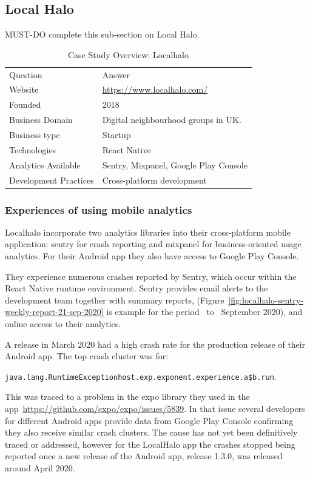\subsection{Local Halo}
MUST-DO complete this sub-section on Local Halo.

\begin{table}[htbp!]
    \centering
    \small
    \begin{tabular}{ll}
       Question &Answer  \\
       Website &\url{https://www.localhalo.com/} \\
       Founded &2018\\
       Business Domain &Digital neighbourhood groups in UK.\\
       Business type &Startup \\
       Technologies  &React Native \\
       Analytics Available &Sentry, Mixpanel, Google Play Console \\
       Development Practices &Cross-platform development
    \end{tabular}
    \caption{Case Study Overview: Localhalo}
    \label{tab:local_halo_anaytics_overview}
\end{table}

\subsubsection{Experiences of using mobile analytics}
Localhalo incorporate two analytics libraries into their cross-platform mobile application: sentry for crash reporting and mixpanel for business-oriented usage analytics. For their Android app they also have access to Google Play Console.

They experience numerous crashes reported by Sentry, which occur within the React Native runtime environment. Sentry provides email alerts to the development team together with summary reports, (Figure~\ref{fig:localhalo-sentry-weekly-report-21-sep-2020} is example for the period~ to~ September 2020), and online access to their analytics.

A release in March 2020 had a high crash rate for the production release of their Android app. The top crash cluster was for:

\texttt{java.lang.RuntimeExceptionhost.exp.exponent.experience.a\$b.run}. 

This was traced to a problem in the expo library they used in the app~\url{https://github.com/expo/expo/issues/5839}. In that issue several developers for different Android apps provide data from Google Play Console confirming they also receive similar crash clusters. The cause has not yet been definitively traced or addressed, however for the LocalHalo app the crashes stopped being reported once a new release of the Android app, release 1.3.0, was released around  April 2020.

